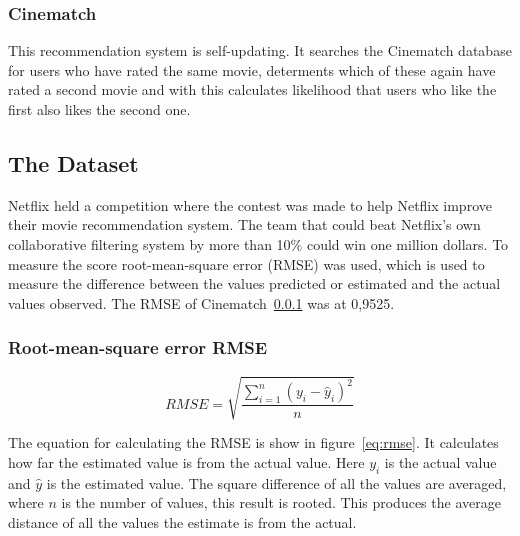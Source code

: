 \subsubsection{Cinematch}
\label{subsec:Cinematch}
This recommendation system is self-updating. It searches the Cinematch database for users who have rated the same movie, determents which of these again have rated a second movie and with this calculates likelihood that users who like the first also likes the second one.


\subsection{The Dataset}\label{subsec:netflixdata}

Netflix held a competition where the contest was made to help Netflix improve their movie recommendation system. The team that could beat Netflix's own collaborative filtering system by more than 10\% could win one million dollars. To measure the score root-mean-square error (RMSE) was used, which is used to measure the difference between the values predicted or estimated and the actual values observed. The RMSE of Cinematch~\ref{subsec:Cinematch} was at 0,9525.

\subsubsection{Root-mean-square error RMSE}\label{subsubsec:rmse}

\begin{equation}\label{eq:rmse}
RMSE = \sqrt {{\frac{{\sum\limits_{{i = 1}}^n {{{\left( {{y_i} - {{\hat{y}}_i}} \right)}^2}} }}{{n}}}}
\end{equation}

The equation for calculating the RMSE is show in figure~\ref{eq:rmse}. It calculates how far the estimated value is from the actual value. Here ${y_i}$ is the actual value and ${\hat{y}}$ is the estimated value. The square difference of all the values are averaged, where ${n}$ is the number of values, this result is rooted. This produces the average distance of all the values the estimate is from the actual.


